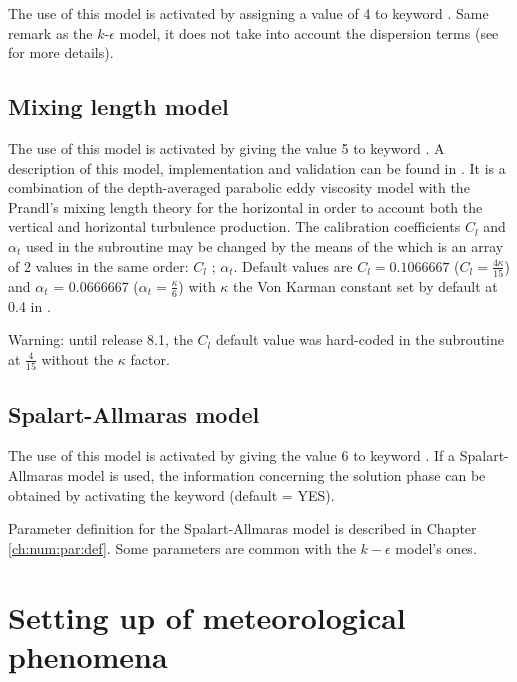 The use of this model is activated by assigning a value of 4 to keyword
.
Same remark as the $k$-$\epsilon$ model, it does not take into account the
dispersion terms (see \cite{Smagorinsky1963} for more details).


\subsection{Mixing length model}

The use of this model is activated by giving the value 5 to keyword
.
A description of this model, implementation and validation can be found in
\cite{Dorfmann2016}.
It is a combination of the depth-averaged parabolic eddy viscosity model
with the Prandl's mixing length theory for the horizontal in order to account
both the vertical and horizontal turbulence production.
The calibration coefficients $C_l$ and $\alpha_t$ used in the
 subroutine may be changed by the means of the
 which is an array of 2 values
in the same order: $C_l$ ; $\alpha_t$.
Default values are $C_l = 0.1066667$ ($C_l = \frac{4 \kappa}{15}$) and
$\alpha_t$ = 0.0666667 ($\alpha_t = \frac{\kappa}{6}$)
with $\kappa$ the Von Karman constant set by default at 0.4 in .

Warning: until release 8.1, the $C_l$ default value was hard-coded in the
 subroutine at $\frac{4}{15}$ without the $\kappa$ factor.

\subsection{Spalart-Allmaras model}

The use of this model is activated by giving the value 6 to keyword
.
If a Spalart-Allmaras model is used, the information concerning
the solution phase can be obtained by activating the keyword
 (default = YES).

Parameter definition for the Spalart-Allmaras model is described in Chapter
\ref{ch:num:par:def}.
Some parameters are common with the $k-\epsilon$ model's ones.


\section{Setting up of meteorological phenomena}
\label{sec:param:met:phen}

